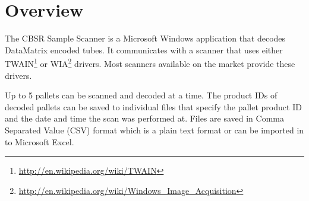 \chapter{Overview}
The CBSR Sample Scanner is a Microsoft Windows application that decodes
DataMatrix encoded tubes. It communicates with a scanner that
uses either TWAIN\footnote{\url{http://en.wikipedia.org/wiki/TWAIN}} or
WIA\footnote{\url{http://en.wikipedia.org/wiki/Windows_Image_Acquisition}}
drivers. Most scanners available on the market provide these
drivers.

Up to 5 pallets can be scanned and decoded at a time. The product IDs of
decoded pallets can be saved to individual files that specify the pallet
product ID and the date and time the scan was performed at. Files are saved in
Comma Separated Value (CSV) format which is a plain text format or can be
imported in to Microsoft Excel.


